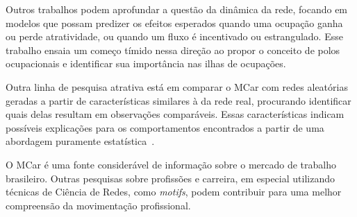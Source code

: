 \documentclass[
  article,
  11pt,
  a4paper,
  english,
  brazil,
  sumario=tradicional]{abntex2}
\begin{document}
Outros trabalhos podem aprofundar a questão da dinâmica da rede, focando em modelos que possam predizer os efeitos esperados quando uma ocupação ganha ou perde atratividade, ou quando um fluxo é incentivado ou estrangulado. Esse trabalho ensaia um começo tímido nessa direção ao propor o conceito de polos ocupacionais e identificar sua importância nas ilhas de ocupações.

Outra linha de pesquisa atrativa está em comparar o MCar com redes aleatórias geradas a partir de características similares à da rede real, procurando identificar quais delas resultam em observações comparáveis. Essas características indicam possíveis explicações para os comportamentos encontrados a partir de uma abordagem puramente estatística~\cite{Barabasi2016-rn}.

O MCar é uma fonte considerável de informação sobre o mercado de trabalho brasileiro. Outras pesquisas sobre profissões e carreira, em especial utilizando técnicas de Ciência de Redes, como \textit{motifs}, podem contribuir para uma melhor compreensão da movimentação profissional.

\newpage


\end{document}

